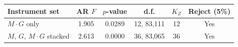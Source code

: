 \begin{tabular}{@{}lccccc@{}}
\toprule
Instrument set & AR $F$ & $p$-value & d.f. & $K_Z$ & Reject (5\%) \\
\midrule
$M\cdot G$ only & 1.905 & 0.0289 & 12, 83,111 & 12 & Yes \\
$M$, $G$, $M\cdot G$ stacked & 2.613 & 0.0000 & 36, 83,065 & 36 & Yes \\
\bottomrule
\end{tabular}

